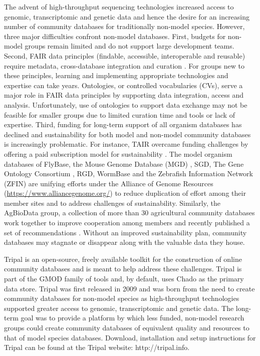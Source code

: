 The advent of high-throughput sequencing technologies increased access to genomic, transcriptomic and genetic data and hence the desire for an increasing number of community databases for traditionally non-model species. However, three major difficulties confront non-model databases. First, budgets for non-model groups remain limited and do not support large development teams. Second, FAIR data principles (findable, accessible, interoperable and reusable) require metadata, cross-database integration and curation \cite{Wilkinson_2016}. For groups new to these principles, learning and implementing appropriate technologies and expertise can take years. Ontologies, or controlled vocabularies (CVs), serve a major role in FAIR data principles by supporting data integration, access and analysis. Unfortunately, use of ontologies to support data exchange may not be feasible for smaller groups due to limited curation time and tools or lack of expertise. Third, funding for long-term support of all organism databases has declined and sustainability for both model and non-model community databases is increasingly problematic. For instance, TAIR overcame funding challenges by offering a paid subscription model for sustainability \cite{reiser2016sustainable}. The model organism databases of FlyBase, the Mouse Genome Database (MGD) \cite{Bult_2018}, SGD, The Gene Ontology Consortium \cite{Ashburner_2000}, RGD, WormBase \cite{kollmar2018eukaryotic,Lee_2017} and the Zebrafish Information Network (ZFIN) \cite{Howe_2012} are unifying efforts under the Alliance of Genome Resources (\url{https://www.alliancegenome.org/}) to reduce duplication of effort among their member sites and to address challenges of sustainability. Similarly, the AgBioData group, a collection of more than 30 agricultural community databases work together to improve cooperation among members and recently published a set of recommendations \cite{Harper_2018}. Without an improved sustainability plan, community databases may stagnate or disappear along with the valuable data they house.

Tripal \cite{Sanderson_2013,Ficklin_2011} is an open-source, freely available toolkit for the construction of online community databases and is meant to help address these challenges. Tripal is part of the GMOD family of tools and, by default, uses Chado as the primary data store. Tripal was first released in 2009 and was born from the need to create community databases for non-model species as high-throughput technologies supported greater access to genomic, transcriptomic and genetic data. The long-term goal was to provide a platform by which less funded, non-model research groups could create community databases of equivalent quality and resources to that of model species databases. Download, installation and setup instructions for Tripal can be found at the Tripal website: http://tripal.info.

